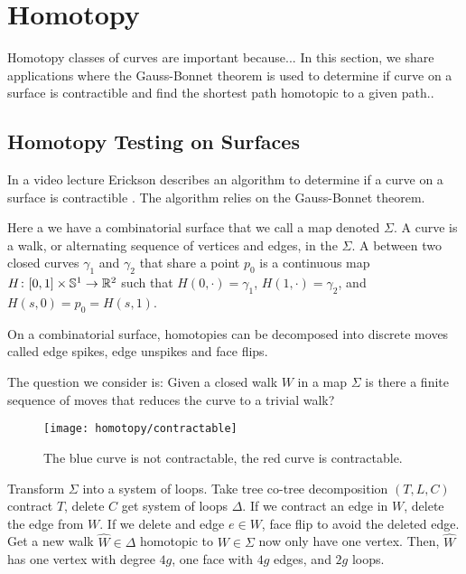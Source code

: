 \section{Homotopy}
\label{sec:homotopy}

Homotopy classes of curves are important  because...
In this section, we share applications
where the Gauss-Bonnet theorem is used to determine
if curve on a surface is contractible and find
the shortest path homotopic to a given path..


\subsection{Homotopy Testing on Surfaces}

In a video lecture Erickson describes an algorithm
to determine if a curve on a surface is contractible \cite{erickson-lecture}.
The algorithm relies on the Gauss-Bonnet theorem.

Here a we have a combinatorial surface that we call a map denoted $\Sigma.$
A curve is a walk, or alternating sequence of vertices
and edges, in the $\Sigma$.
A  between two closed curves $\gamma_1$ and $\gamma_2$ that 
share a point $p_0$ is a continuous map $H\colon [0,1]\times \mathbb{S}^1 \to \mathbb{R}^2$ 
such that $H(0,\cdot)=\gamma_1$, $H(1,\cdot)=\gamma_2$, and $H(s,0)=p_0=H(s,1)$.

On a combinatorial surface, homotopies can be decomposed
into discrete moves called edge spikes, edge unspikes  and face flips.

The question we consider is: Given a closed walk $W$ in a map $\Sigma$ is there a finite
sequence of moves that reduces the curve to a trivial walk?

\begin{figure}[htb]
\centering
\texttt{[image: homotopy/contractable]}
\caption{The blue curve is not contractable, the red curve is contractable.}
\label{fig:contractable}
\end{figure}

Transform $\Sigma$ into a system of loops.  
Take tree co-tree decomposition $(T,L,C)$
contract $T$, delete $C$ get system of loops $\Delta$.
If we contract an edge in $W$, delete the edge from $W$.
If we delete and edge $e\in W$, face flip to avoid the deleted edge.
Get a new walk $\hat{W} \in \Delta$ homotopic to $W\in \Sigma$
now only have one vertex. Then, $\hat{W}$ has one vertex
with degree $4g$, one face with $4g$ edges, and $2g$ loops.

